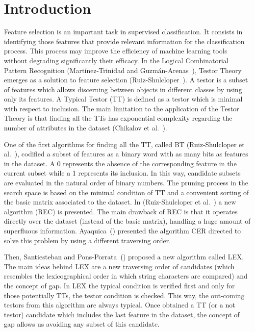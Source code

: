 \documentclass[citeauthoryear]{llncs}
\begin{document}
\section{Introduction}
%
	Feature selection is an important task in supervised classification. It consists in identifying those features that provide relevant information for the classification process. This process may improve the efficiency of machine learning tools without degrading significantly their efficacy.
	In the Logical Combinatorial Pattern Recognition (Mart\'inez-Trinidad and Guzm\'an-Arenas~\cite{Martinez2001}), Testor Theory emerges as a solution to feature selection (Ruiz-Shulcloper~\cite{Shulcloper2008}). A testor is a subset of features which allows discerning between objects in different classes by using only its features. A Typical Testor (TT) is defined as a testor which is minimal with respect to inclusion. The main limitation to the application of the Testor Theory is that finding all the TTs has exponential complexity regarding the number of attributes in the dataset (Chikalov et al.~\cite{Chikalov13}).
	
	One of the first algorithms for finding all the TT, called BT (Ruiz-Shulcloper et al.~\cite{Shulcloper1982}), codified a subset of features as a binary word with as many bits as features in the dataset. A 0 represents the absence of the corresponding feature in the current	subset while a 1 represents its inclusion. In this way, candidate subsets are evaluated in the natural order of binary numbers. The pruning process in the	search space is based on the minimal condition of TT and a convenient sorting of the basic matrix associated to the dataset. In (Ruiz-Shulcloper et al.~\cite{Shulcloper1995b}) a new algorithm (REC) is presented.	The main drawback of REC is that it operates directly over the dataset (instead of the	basic matrix), handling a huge amount of superfluous information. Ayaquica~(\cite{Ayaquica1997})	presented the algorithm CER directed to solve this problem by using a different traversing	order. 
	
	Then, Santiesteban and Pons-Porrata~(\cite{Santiesteban2003}) proposed a new algorithm called LEX. The main ideas behind LEX are a new traversing order of candidates (which resembles the	lexicographical order in which string characters are compared) and the concept of gap. In LEX the typical condition is verified first and only for those potentially TTs, the testor condition is checked. This way, the out-coming testors from this algorithm are always typical. Once obtained a TT (or a not testor) candidate which includes the last feature in the dataset, the concept of gap allows us avoiding any subset of this candidate.
	
\end{document}
